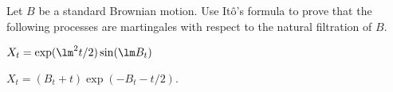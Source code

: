 

\item [2.1] Let $B$ be a standard Brownian motion. Use It\^o's formula to prove that the following processes are martingales with respect to the natural filtration of $B$.
\ben
\item $X_t = \exp(\lm^2t/2) \sin(\lm B_t)$
\item $X_t = (B_t + t) \exp(-B_t - t/2)$.
\een

